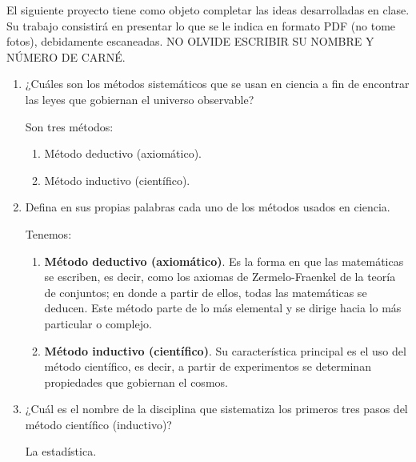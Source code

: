 





El siguiente proyecto tiene como objeto completar las ideas desarrolladas en clase. Su trabajo consistirá en presentar lo que se le indica en formato PDF (no tome fotos), debidamente escaneadas. NO OLVIDE ESCRIBIR SU NOMBRE Y NÚMERO DE CARNÉ. 

\begin{enumerate}
	\item ¿Cuáles son los métodos sistemáticos que se usan en ciencia a fin de encontrar las leyes que gobiernan el universo observable?
	\begin{sol}
		Son tres métodos: 
		\begin{enumerate}
			\item Método deductivo (axiomático).
			\item Método inductivo (científico).
		\end{enumerate}
	\end{sol}
	
	\item Defina en sus propias palabras cada uno de los métodos usados en ciencia.
	\begin{sol}
		Tenemos: 
		\begin{enumerate}
			\item \textbf{Método deductivo (axiomático)}. Es la forma en que las matemáticas se escriben, es decir, como los axiomas de Zermelo-Fraenkel de la teoría de conjuntos; en donde a partir de ellos, todas las matemáticas se deducen. Este método parte de lo más elemental y se dirige hacia lo más particular o complejo. 
			\item \textbf{Método inductivo (científico)}. Su característica principal es el uso del método científico, es decir, a partir de experimentos se determinan propiedades que gobiernan el cosmos. 
		\end{enumerate}
	\end{sol}

	\item ¿Cuál es el nombre de la disciplina que sistematiza los primeros tres pasos del método científico (inductivo)?
	\begin{sol}
		La estadística.
	\end{sol}
	

\end{enumerate}
